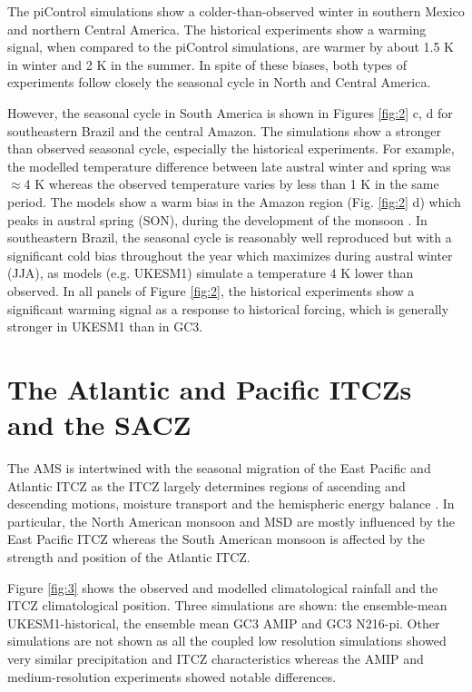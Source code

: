 The piControl simulations show a colder-than-observed winter in southern Mexico and northern Central America. The historical experiments show a warming signal, when compared to the piControl simulations, are warmer by  about 1.5 K in winter and 2 K in the summer. In spite of these biases, both types of experiments follow closely the seasonal cycle in North and Central America.

However, the seasonal cycle in South America is shown in Figures \ref{fig:2} c, d for southeastern Brazil and the central Amazon.
The simulations show a stronger than observed seasonal cycle, especially the historical experiments. For example, the modelled temperature difference between late austral winter and spring was $\approx$4 K whereas the observed temperature varies by less than 1 K in the same period. The models show a warm bias in the Amazon region (Fig. \ref{fig:2} d) which peaks in austral spring (SON), during the development of the monsoon \citep{marengo2012}.
In southeastern Brazil, the seasonal cycle is reasonably well reproduced but with a significant cold bias throughout the year which maximizes during austral winter (JJA), as models (e.g. UKESM1) simulate  a temperature 4 K lower than observed.
In all panels of Figure \ref{fig:2}, the historical experiments show a significant warming signal as a response to historical forcing, which is generally stronger in UKESM1 than in GC3. 

\section{The Atlantic and Pacific ITCZs and the SACZ}\label{sq:itcz}



The AMS is intertwined with the seasonal migration of the East Pacific and Atlantic ITCZ as the ITCZ largely determines regions of ascending and descending motions, moisture transport and the hemispheric energy balance \citep{oueslati2013,li2014,zhou2016,cai2019pantropical}. In particular, the North American monsoon and MSD are mostly influenced by the East Pacific ITCZ whereas the South American monsoon is affected by the strength and position of the Atlantic ITCZ. 


Figure \ref{fig:3} shows the observed and modelled climatological rainfall and the ITCZ climatological position. Three simulations are shown: the ensemble-mean UKESM1-historical, the ensemble mean GC3 AMIP and GC3 N216-pi.
Other simulations are not shown as all the coupled low resolution simulations showed very similar precipitation and ITCZ characteristics whereas the AMIP and medium-resolution experiments showed notable differences.

